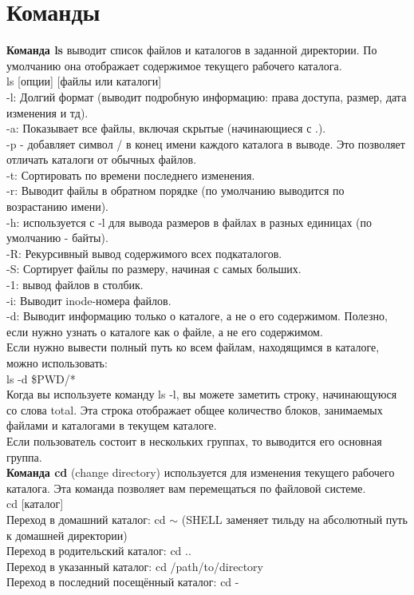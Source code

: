\section{Команды}
\textbf{Команда ls} выводит список файлов и каталогов в заданной директории. По умолчанию она отображает содержимое текущего рабочего каталога. \\
ls [опции] [файлы или каталоги] \\
-l: Долгий формат (выводит подробную информацию: права доступа, размер, дата изменения и тд). \\
-a: Показывает все файлы, включая скрытые (начинающиеся с .). \\
-p - добавляет символ / в конец имени каждого каталога в выводе. Это позволяет отличать каталоги от обычных файлов. \\
-t: Сортировать по времени последнего изменения. \\
-r: Выводит файлы в обратном порядке (по умолчанию выводится по возрастанию имени). \\
-h: используется с -l для вывода размеров в файлах в разных единицах (по умолчанию - байты). \\
-R: Рекурсивный вывод содержимого всех подкаталогов. \\
-S: Сортирует файлы по размеру, начиная с самых больших. \\
-1: вывод файлов в столбик. \\
-i: Выводит inode-номера файлов. \\
-d: Выводит информацию только о каталоге, а не о его содержимом. Полезно, если нужно узнать о каталоге как о файле, а не его содержимом. \\
Если нужно вывести полный путь ко всем файлам, находящимся в каталоге, можно использовать: \\
ls -d \$PWD/* \\
Когда вы используете команду ls -l, вы можете заметить строку, начинающуюся со слова total. Эта строка отображает общее количество блоков, занимаемых файлами и каталогами в текущем каталоге. \\
Если пользователь состоит в нескольких группах, то выводится его основная группа. \\
\newpage
\noindent \textbf{Команда cd} (change directory) используется для изменения текущего рабочего каталога. Эта команда позволяет вам перемещаться по файловой системе. \\
cd [каталог] \\
Переход в домашний каталог: cd $\sim$ (SHELL заменяет тильду на абсолютный путь к домашней директории) \\
Переход в родительский каталог: cd .. \\
Переход в указанный каталог: cd /path/to/directory \\
Переход в последний посещённый каталог: cd - \\

